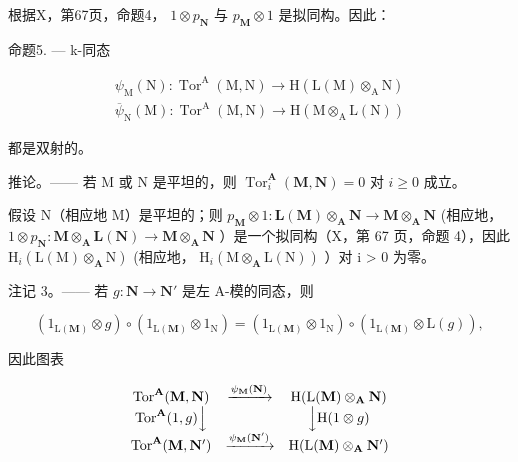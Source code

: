 根据X，第67页，命题4， \(1 \otimes p_{\mathbf{N}}\) 与 \(p_{\mathbf{M}} \otimes 1\) 是拟同构。因此：

命题5. --- k-同态

\[
\begin{array}{l} \psi_ {\mathrm{M}} (\mathrm{N}): \operatorname{Tor} ^ {\mathrm{A}} (\mathrm{M}, \mathrm{N}) \to \mathrm{H} (\mathrm{L} (\mathrm{M}) \otimes_ {\mathrm{A}} \mathrm{N}) \\ \overline {{\psi}} _ {\mathrm{N}} (\mathrm{M}): \operatorname{Tor} ^ {\mathrm{A}} (\mathrm{M}, \mathrm{N}) \to \mathrm{H} (\mathrm{M} \otimes_ {\mathrm{A}} \mathrm{L} (\mathrm{N})) \end{array}
\]

都是双射的。

推论。—— 若 M 或 N 是平坦的，则 \(\operatorname{Tor}_{i}^{\mathbf{A}}(\mathbf{M},\mathbf{N}) = 0\) 对 \(i \geqslant 0\) 成立。

假设 N（相应地 M）是平坦的；则 \(p_{\mathbf{M}} \otimes 1 : \mathbf{L}(\mathbf{M}) \otimes_{\mathbf{A}} \mathbf{N} \to \mathbf{M} \otimes_{\mathbf{A}} \mathbf{N}\) (相应地， \(1 \otimes p_{\mathbf{N}} : \mathbf{M} \otimes_{\mathbf{A}} \mathbf{L}(\mathbf{N}) \to \mathbf{M} \otimes_{\mathbf{A}} \mathbf{N}\) ）是一个拟同构（X，第 67 页，命题 4），因此 \(\mathrm{H}_{i}(\mathrm{L}(\mathrm{M}) \otimes_{\mathbf{A}} \mathrm{N})\) (相应地， \(\mathrm{H}_{i}(\mathrm{M} \otimes_{\mathbf{A}} \mathrm{L}(\mathrm{N}))\) ）对 i \textgreater{} 0 为零。

注记 3。—— 若 \(g: \mathbf{N} \to \mathbf{N}'\) 是左 A-模的同态，则

\[
\left(1 _ {\mathrm{L} (\mathbf {M})} \otimes g\right) \circ \left(1 _ {\mathrm{L} (\mathbf {M})} \otimes 1 _ {\mathrm{N}}\right) = \left(1 _ {\mathrm{L} (\mathbf {M})} \otimes 1 _ {\mathrm{N}}\right) \circ \left(1 _ {\mathrm{L} (\mathbf {M})} \otimes \mathrm{L} (g)\right),
\]

因此图表

\[
\begin{array}{c c c} \operatorname{Tor} ^ {\mathbf {A}} (\mathbf {M}, \mathbf {N}) & \xrightarrow {\psi_ {\mathbf {M}} (\mathbf {N})} & \mathrm{H} (\mathrm{L} (\mathbf {M}) \otimes_ {\mathbf {A}} \mathbf {N}) \\ \operatorname{Tor} ^ {\mathbf {A}} (1, g) \Big \downarrow & & \Big \downarrow \mathrm{H} (1 \otimes g) \\ \operatorname{Tor} ^ {\mathbf {A}} (\mathbf {M}, \mathbf {N} ^ {\prime}) & \xrightarrow {\psi_ {\mathbf {M}} (\mathbf {N} ^ {\prime})} & \mathrm{H} (\mathrm{L} (\mathbf {M}) \otimes_ {\mathbf {A}} \mathbf {N} ^ {\prime}) \end{array}
\]

